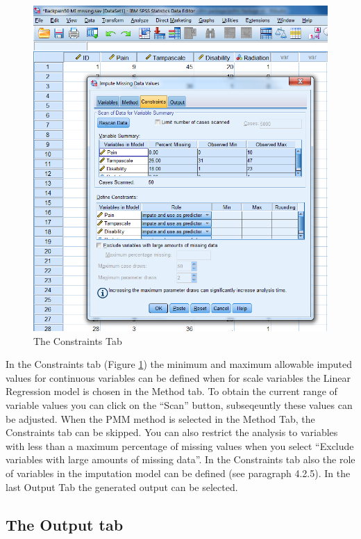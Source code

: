 \documentclass[
]{book}
\begin{document}
\begin{figure}

{\centering \includegraphics[width=0.9\linewidth]{images/fig4.8} 

}

\caption{The Constraints Tab}\label{fig:fig4-8}
\end{figure}

In the Constraints tab (Figure \ref{fig:fig4-8}) the minimum and maximum allowable imputed values for continuous variables can be defined when for scale variables the Linear Regression model is chosen in the Method tab. To obtain the current range of variable values you can click on the ``Scan'' button, subseqeuntly these values can be adjusted. When the PMM method is selected in the Method Tab, the Constraints tab can be skipped. You can also restrict the analysis to variables with less than a maximum percentage of missing values when you select ``Exclude variables with large amounts of missing data''.
In the Constraints tab also the role of variables in the imputation model can be defined (see paragraph 4.2.5). In the last Output Tab the generated output can be selected.

\hypertarget{the-output-tab}{%
\subsection{The Output tab}\label{the-output-tab}}
\end{document}
